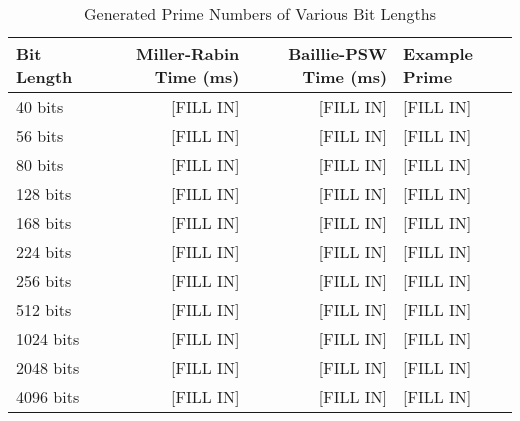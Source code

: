 \begin{table}[H]
\centering
\caption{Generated Prime Numbers of Various Bit Lengths}
\label{tab:prime_numbers}
\begin{tabular}{@{}lrrl@{}}
\toprule
\textbf{Bit Length} & \textbf{Miller-Rabin Time (ms)} & \textbf{Baillie-PSW Time (ms)} & \textbf{Example Prime} \\
\midrule
40 bits     & [FILL IN] & [FILL IN] & [FILL IN] \\
56 bits     & [FILL IN] & [FILL IN] & [FILL IN] \\
80 bits     & [FILL IN] & [FILL IN] & [FILL IN] \\
128 bits    & [FILL IN] & [FILL IN] & [FILL IN] \\
168 bits    & [FILL IN] & [FILL IN] & [FILL IN] \\
224 bits    & [FILL IN] & [FILL IN] & [FILL IN] \\
256 bits    & [FILL IN] & [FILL IN] & [FILL IN] \\
512 bits    & [FILL IN] & [FILL IN] & [FILL IN] \\
1024 bits   & [FILL IN] & [FILL IN] & [FILL IN] \\
2048 bits   & [FILL IN] & [FILL IN] & [FILL IN] \\
4096 bits   & [FILL IN] & [FILL IN] & [FILL IN] \\
\bottomrule
\end{tabular}
\end{table} 